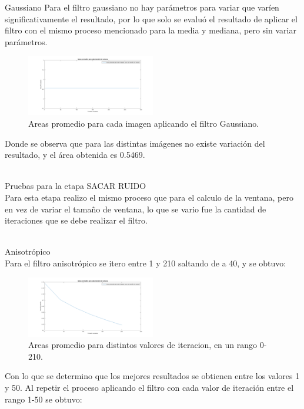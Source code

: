 Gaussiano 
Para el filtro gaussiano no hay parámetros para variar que varíen significativamente el resultado, por lo que solo se evaluó el resultado de aplicar el filtro con el mismo proceso mencionado para la media y mediana, pero sin variar parámetros. 

\begin{figure}[h]
	{
	\centering
	\includegraphics[width=0.50\textwidth]{Figures/Gaussiano}
	\caption[An Electron]{Areas promedio para cada imagen aplicando el filtro Gaussiano.}
	}
\end{figure}

Donde se observa que para las distintas imágenes no existe variación del resultado, y el área obtenida es 0.5469.

\\Pruebas para la etapa SACAR  RUIDO\\
Para esta etapa realizo el mismo proceso   que para el calculo de la ventana, pero en vez de variar el tamaño de ventana,  lo que se vario fue la cantidad de iteraciones que se debe realizar el filtro. 

\\Anisotrópico\\
Para el filtro anisotrópico se itero entre 1 y 210 saltando de a 40, y se obtuvo:

\begin{figure}[h]
	{
	\centering
	\includegraphics[width=0.50\textwidth]{Figures/AnisotropicoRangoGrande}
	\caption[An Electron]{Areas promedio para distintos valores de iteracion, en un rango 0-210.}
	}
\end{figure}

Con lo que se determino que los mejores resultados se obtienen entre los valores 1 y 50. Al repetir el proceso aplicando el filtro con cada valor de iteración entre el rango 1-50 se obtuvo:

